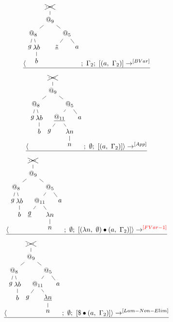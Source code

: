 \documentclass[a4paper, 10pt]{article}
\begin{document}
\begin{align*}
  \langle \begin{tikzpicture}[sibling distance=5em,level distance=2em]
    \node {\xcancel{$\dots$}}
    child { node {$@_9$}
      child { node {$@_8$}[sibling distance=1em]
        child { node {$g$}}
        child { node {$\lambda b$}
          child { node {$b$}}}}
      child { node {$@_5$}[sibling distance=3em]
        child { node {$\underline{z}$}}
        child { node {$a$}}}};
  \end{tikzpicture};\ \Gamma_2;\ [ (a,\ \Gamma_2) ] & \rightarrow^{[BVar]} \\
  \hline
\end{align*}
\begin{align*}
  \langle \begin{tikzpicture}[sibling distance=5em,level distance=2em]
    \node {\xcancel{$\dots$}}
    child { node {$@_9$}
      child { node {$@_8$}[sibling distance=1em]
        child { node {$g$}}
        child { node {$\lambda b$}
          child { node {$b$}}}}
      child { node {$@_5$}[sibling distance=3em]
        child { node {$\underline{@_{11}}$}
          child { node {$g$}}
          child { node {$\lambda n$}
            child { node {$n$}}}}
        child { node {$a$}}}};
  \end{tikzpicture};\ \emptyset;\ [ (a,\ \Gamma_2) ] \rangle & \rightarrow^{[App]}\\
  \hline
\end{align*}
\begin{align*}
  \langle \begin{tikzpicture}[sibling distance=5em,level distance=2em]
    \node {\xcancel{$\dots$}}
    child { node {$@_9$}
      child { node {$@_8$}[sibling distance=1em]
        child { node {$g$}}
        child { node {$\lambda b$}
          child { node {$b$}}}}
      child { node {$@_5$}[sibling distance=3em]
        child { node {$@_{11}$}
          child { node {$\underline{g}$}}
          child { node {$\lambda n$}
            child { node {$n$}}}}
        child { node {$a$}}}};
  \end{tikzpicture};\ \emptyset;\ [ (\lambda n,\ \emptyset) \bullet (a,\ \Gamma_2) ] \rangle &
  \rightarrow^{\color{red}[FVar-1]}\\
  \hline
\end{align*}
\begin{align*}
  \langle \begin{tikzpicture}[sibling distance=5em,level distance=2em]
    \node {\xcancel{$\dots$}}
    child { node {$@_9$}
      child { node {$@_8$}[sibling distance=1em]
        child { node {$g$}}
        child { node {$\lambda b$}
          child { node {$b$}}}}
      child { node {$@_5$}[sibling distance=3em]
        child { node {$@_{11}$}
          child { node {$g$}}
          child { node {$\underline{\lambda n}$}
            child { node {$n$}}}}
        child { node {$a$}}}};
  \end{tikzpicture};\ \emptyset;\ [ \$ \bullet (a,\ \Gamma_2) ] \rangle & \rightarrow^{[Lam-Non-Elim]}\\
  \hline
\end{align*}
\end{document}

